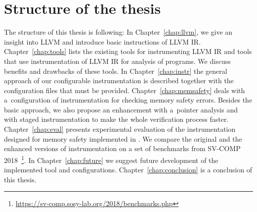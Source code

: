 \section{Structure of the thesis}

The structure of this thesis is following: In Chapter~\ref{chap:llvm}, we give
an insight into LLVM and introduce basic instructions of LLVM IR.
Chapter~\ref{chap:tools} lists the existing tools for instrumenting LLVM IR and
tools that use instrumentation of LLVM IR for analysis of programs. We discuss
benefits and drawbacks of these tools. In Chapter~\ref{chap:instr} the general
approach of our configurable instrumentation is described together with the
configuration files that must be provided. Chapter~\ref{chap:memsafety} deals
with a~configuration of instrumentation for checking memory safety errors.
Besides the basic approach, we also propose an enhancement with a~pointer
analysis and with staged instrumentation to make the whole verification process
faster. Chapter~\ref{chap:eval} presents experimental evaluation of the
instrumentation designed for memory safety implemented in \symbiotic. We
compare the original and the enhanced versions of instrumentation on a set of
benchmarks from SV-COMP
2018~\footnote{\url{https://sv-comp.sosy-lab.org/2018/benchmarks.php}}.  In
Chapter~\ref{chap:future} we suggest future development of the implemented tool
and configurations. Chapter~\ref{chap:conclusion} is a conclusion of this
thesis.
